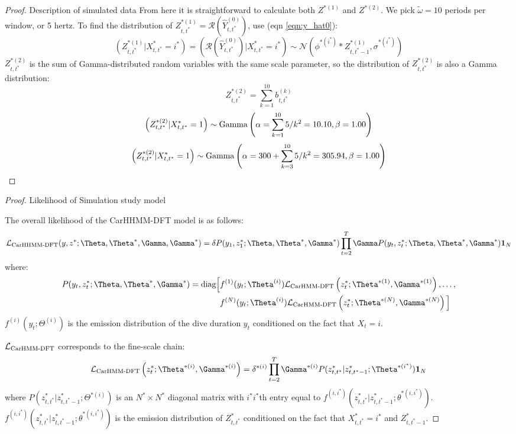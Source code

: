 \begin{proof}{Description of simulated data}{}
From here it is straightforward to calculate both $Z^{*(1)}$ and $Z^{*(2)}$. We pick $\tilde{\omega} = 10$ periods per window, or 5 hertz. To find the distribution of $Z^{*(1)}_{t,t^*} = \mathcal{R}\left(\hat{Y}^{(0)}_{t,t^*}\right)$, use (eqn \ref{eqn:y_hat0}):
%
$$\left(Z^{*(1)}_{t,t^*} | X^*_{t,t^*} = i^* \right) = \left(\mathcal{R}\left(\hat{Y}^{(0)}_{t,t^*}\right) | X^*_{t,t^*} = i^* \right) \sim \mathcal{N} \left(\phi^{*(i^*)} * Z^{*(1)}_{t,t^*-1}, \sigma^{*(i^*)} \right)$$
%
$Z^{*(2)}_{t,t^*}$ is the sum of Gamma-distributed random variables with the same scale parameter, so the distribution of $Z^{*(2)}_{t,t^*}$ is also a Gamma distribution:
%
$$Z^{*(2)}_{t,t^*} = \sum_{k=1}^{10} b^{(k)}_{t,t^*}$$
$$\left(Z^{*(2)}_{t,t^*}|X^*_{t,t^*} = 1\right) \sim {\rm{Gamma}}\left(\alpha = \sum_{k=1}^{10} 5/k^2 = 10.10, \beta = 1.00 \right)$$
$$\left(Z^{*(2)}_{t,t^*}|X^*_{t,t^*} = 1\right) \sim {\rm{Gamma}}\left(\alpha = 300 + \sum_{k=3}^{10} 5/k^2 = 305.94 , \beta = 1.00 \right)$$
\end{proof}

\begin{proof}{Likelihood of Simulation study model}{}

The overall likelihood of the CarHHMM-DFT model is as follows:
%
$$\calL_{\text{CarHHMM-DFT}}(y,z^*;\Theta,\Theta^*,\Gamma,\Gamma^*) = \delta P(y_1,z_1^*;\Theta,\Theta^*,\Gamma^*) \prod_{t=2}^T \Gamma P(y_t,z_t^*;\Theta,\Theta^*,\Gamma^*) \mathbf{1}_N$$
%
where:
%
\begin{align*}
P(y_t,z_t^*;\Theta,\Theta^*,\Gamma^*)  = \text{diag}\Big[&f^{(1)}(y_t;\Theta^{(i)})\calL_{\text{CarHMM-DFT}}\left(z_t^*;\Theta^{*(1)},\Gamma^{*(1)}\right), \ldots , \\
&f^{(N)}(y_t;\Theta^{(i)})\calL_{\text{CarHMM-DFT}}\left(z_t^*;\Theta^{*(N)},\Gamma^{*(N)}\right) \Big]
\end{align*}
%
$f^{(i)}(y_t;\Theta^{(i)})$ is the emission distribution of the dive duration $y_t$ conditioned on the fact that $X_t = i$.

$\mathcal{L}_{\text{CarHMM-DFT}}$ corresponds to the fine-scale chain:
%
$$\calL_{\text{CarHMM-DFT}}\left(z_t^*;\Theta^{*(i)},\Gamma^{*(i)}\right) = \delta^{*(i)} \prod_{t=2}^T \Gamma^{*(i)} P(z^*_{t,t^*}|z^*_{t,t^*-1};\Theta^{*(i^*)}) \mathbf{1}_N$$
%
where $P(z^*_{t,t^*}|z^*_{t,t^*-1};\Theta^{*(i)})$ is an $N^* \times N^*$ diagonal matrix with $i^*i^*$th entry equal to $f^{(i,i^*)}(z^*_{t,t^*}|z^*_{t,t^*-1}; \theta^{*(i,i^*)})$.
%
$f^{(i,i^*)}(z^*_{t,t^*}|z^*_{t,t^*-1}; \theta^{*(i,i^*)})$ is the emission distribution of $Z^*_{t,t^*}$ conditioned on the fact that $X^*_{t,t^*} = i^*$ and $Z^*_{t,t^*-1}$.

\end{proof}











